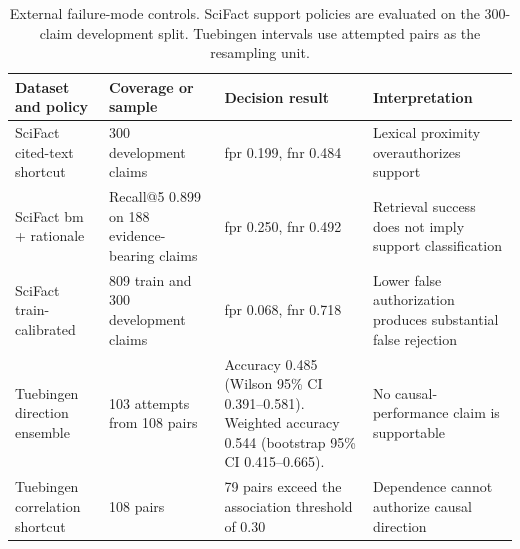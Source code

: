 \begin{table}[t!]
\centering
\caption{External failure-mode controls. SciFact support policies are evaluated
on the 300-claim development split. Tuebingen intervals use attempted pairs as
the resampling unit.}
\label{tab:external-controls}
\small
\renewcommand{\arraystretch}{1.12}
\begin{tabularx}{\textwidth}{@{}p{}p{}p{}Y@{}}
\toprule
Dataset and policy & Coverage or sample & Decision result & Interpretation \\
\midrule
SciFact cited-text shortcut & 300 development claims & \acs{fpr} 0.199, \acs{fnr} 0.484 & Lexical proximity overauthorizes support \\
SciFact \acs{bm} + rationale & Recall@5 0.899 on 188 evidence-bearing claims & \acs{fpr} 0.250, \acs{fnr} 0.492 & Retrieval success does not imply support classification \\
SciFact train-calibrated & 809 train and 300 development claims & \acs{fpr} 0.068, \acs{fnr} 0.718 & Lower false authorization produces substantial false rejection \\
\addlinespace[2pt]
Tuebingen direction ensemble & 103 attempts from 108 pairs & Accuracy 0.485 (Wilson 95\% CI 0.391--0.581). Weighted accuracy 0.544 (bootstrap 95\% CI 0.415--0.665). & No causal-performance claim is supportable \\
Tuebingen correlation shortcut & 108 pairs & 79 pairs exceed the association threshold of 0.30 & Dependence cannot authorize causal direction \\
\bottomrule
\end{tabularx}
\end{table}
